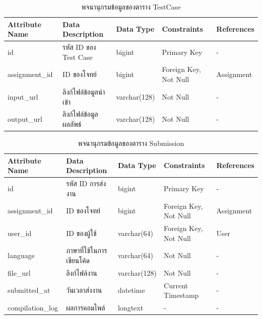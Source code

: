 \documentclass[12pt,one side,openright,a4paper]{cpe-thesis-th}
\begin{document}
    \begin{table}[H]
        \centering
        \caption{พจนานุกรมข้อมูลของตาราง TestCase}\label{tbl:data-dict-testcase}
        \begin{tabular}{p{2cm}|p{4cm}p{2cm}p{3cm}p{2cm}} \hline\hline
            Attribute Name & Data Description & Data Type & Constraints & References \\ \hline\hline
            id & รหัส ID ของ Test Case & bigint & Primary Key & - \\
            assignment\_id & ID ของโจทย์ & bigint & Foreign Key, Not Null & Assignment \\
            input\_url & ลิงก์ไฟล์ข้อมูลนำเข้า & varchar(128) & Not Null & - \\
            output\_url & ลิงก์ไฟล์ข้อมูลผลลัพธ์ & varchar(128) & Not Null & - \\ \hline\hline
        \end{tabular}   
    \end{table}
    \begin{table}[H]
        \centering
        \caption{พจนานุกรมข้อมูลของตาราง Submission}\label{tbl:data-dict-submission}
        \begin{tabular}{p{2cm}|p{4cm}p{2cm}p{3cm}p{2cm}} \hline\hline
            Attribute Name & Data Description & Data Type & Constraints & References \\ \hline\hline
            id & รหัส ID การส่งงาน & bigint & Primary Key & - \\
            assignment\_id & ID ของโจทย์ & bigint & Foreign Key, Not Null & Assignment \\
            user\_id & ID ของผู้ใช้ & varchar(64) & Foreign Key, Not Null & User \\
            language & ภาษาที่ใช้ในการเขียนโค้ด & varchar(64) & Not Null & - \\
            file\_url & ลิงก์ไฟล์งาน & varchar(128) & Not Null & - \\
            submitted\_at & วันเวลาส่งงาน & datetime & Current Timestamp & - \\
            compilation\_log & ผลการคอมไพล์ & longtext & - & - \\ \hline\hline
        \end{tabular}   
    \end{table}
\end{document}
